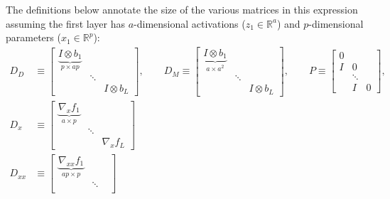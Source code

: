 \documentclass{article}
\begin{document}
The definitions below annotate the size of the various matrices in this
expression assuming the first layer has $a$-dimensional activations ($z_1 \in
    \mathbb{R}^a$) and $p$-dimensional parameters ($x_1 \in \mathbb{R}^p$):
\begin{align*}
    D_D    & \equiv \begin{bmatrix}
                        \underbrace{I \otimes b_1}_{p \times ap} &        &               \\
                                                                 & \ddots &               \\
                                                                 &        & I \otimes b_L
                    \end{bmatrix}
    ,
    \qquad
    D_M \equiv \begin{bmatrix}
                   \underbrace{I \otimes b_1}_{a \times a^2} &        &               \\
                                                             & \ddots &               \\
                                                             &        & I \otimes b_L
               \end{bmatrix}
    ,
    \qquad
    P  \equiv \begin{bmatrix}
                  0 \\ I & 0 \\ &\ddots \\ &I&0
              \end{bmatrix}
    ,                                                                                                \\
    D_x    & \equiv  \begin{bmatrix}
                         \underbrace{\nabla_x f_1}_{a\times p} &                       \\
                                                               & \ddots                \\
                                                               &        & \nabla_x f_L
                     \end{bmatrix}
    \\
    D_{xx} & \equiv \begin{bmatrix}
                        \underbrace{\nabla_{xx} f_1}_{ap\times p} &        &                 \\
                                                                  & \ddots &                 \\

\end{bmatrix}
\end{align*}
\end{document}
